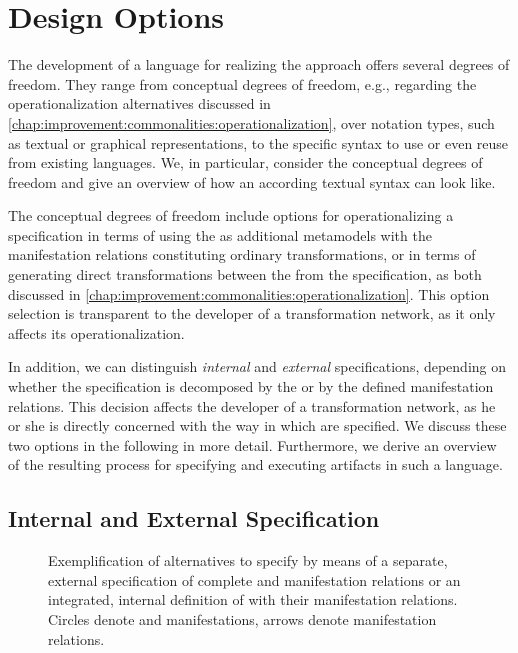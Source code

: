 \section{Design Options}

The development of a language for realizing the \commonalities approach offers several degrees of freedom.
They range from conceptual degrees of freedom, e.g., regarding the operationalization alternatives discussed in \autoref{chap:improvement:commonalities:operationalization}, over notation types, such as textual or graphical representations, to the specific syntax to use or even reuse from existing languages.
We, in particular, consider the conceptual degrees of freedom and give an overview of how an according textual syntax can look like.

The conceptual degrees of freedom include options for operationalizing a specification in terms of using the \conceptmetamodels as additional metamodels with the manifestation relations constituting ordinary transformations, or in terms of generating direct transformations between the \concretemetamodels from the \commonalities specification, as both discussed in \autoref{chap:improvement:commonalities:operationalization}.
This option selection is transparent to the developer of a transformation network, as it only affects its operationalization.

In addition, we can distinguish \emph{internal} and \emph{external} specifications, depending on whether the specification is decomposed by the \commonalities or by the defined manifestation relations.
This decision affects the developer of a transformation network, as he or she is directly concerned with the way in which \commonalities are specified.
We discuss these two options in the following in more detail.
Furthermore, we derive an overview of the resulting process for specifying and executing artifacts in such a language.


\subsection{Internal and External Specification}
\label{chap:language:design:internal_external}

\begin{figure}
    \centering
    
    \caption[Design options for \commonalities specification]{Exemplification of alternatives to specify \commonalities by means of a separate, external specification of complete \conceptmetamodels and manifestation relations or an integrated, internal definition of \commonalities with their manifestation relations. Circles denote \commonalities and manifestations, arrows denote manifestation relations.}
    \label{fig:language:design_options}
\end{figure}

